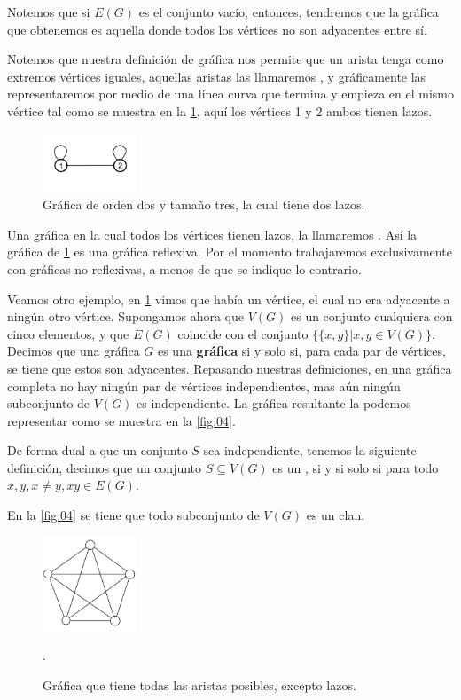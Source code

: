 Notemos que si $E(G)$ es el conjunto vacío, entonces, tendremos que la gráfica que obtenemos es aquella donde todos los vértices no son adyacentes entre sí.

Notemos que nuestra definición de gráfica nos permite que un arista tenga como extremos vértices iguales, aquellas aristas las llamaremos , y gráficamente las representaremos por medio de una linea curva que
termina y empieza en el mismo vértice tal como se muestra en la \cref{fig:02}, aquí los vértices 1 y 2 ambos tienen lazos.

\begin{figure}[H]
  \centering
  \includegraphics[width=0.25\textwidth]{recursos/capturas/02.jpg}
  \caption{Gráfica de orden dos y tamaño tres, la cual tiene dos lazos.}
  \label{fig:02}
\end{figure}

Una gráfica en la cual todos los vértices tienen lazos, la llamaremos . Así la gráfica de \cref{fig:02} es una gráfica reflexiva. Por el momento trabajaremos exclusivamente con gráficas no reflexivas, a menos de que se indique lo contrario.

Veamos otro ejemplo, en \cref{fig:02} vimos que había un vértice, el cual no era adyacente a ningún otro vértice. Supongamos ahora que $V(G)$ es un conjunto cualquiera con cinco elementos, y que $E(G)$ coincide con el conjunto $\{ \{x,y\} | x,y\in V(G) \}$.
Decimos que una gráfica $G$ es una \textbf{gráfica} si y solo si, para cada par de vértices, se tiene que estos son adyacentes. Repasando nuestras definiciones, en una gráfica completa no hay ningún par de vértices independientes, mas aún ningún subconjunto de $V(G)$ es independiente.
La gráfica resultante la podemos representar como se muestra en la \cref{fig:04}.

De forma dual a que un conjunto $S$ sea independiente, tenemos la siguiente definición, decimos que un conjunto $S\subseteq V(G)$ es un , si y si solo si para todo $x,y, x\neq y, xy\in E(G)$.   

En la \cref{fig:04} se tiene que todo subconjunto de $V(G)$ es un clan.

\begin{figure}[H]
  \centering
  \includegraphics[width=0.25\textwidth]{recursos/capturas/04.jpg}
  \caption{Gráfica que tiene todas las aristas posibles, excepto lazos.}.
  \label{fig:03}
\end{figure}

